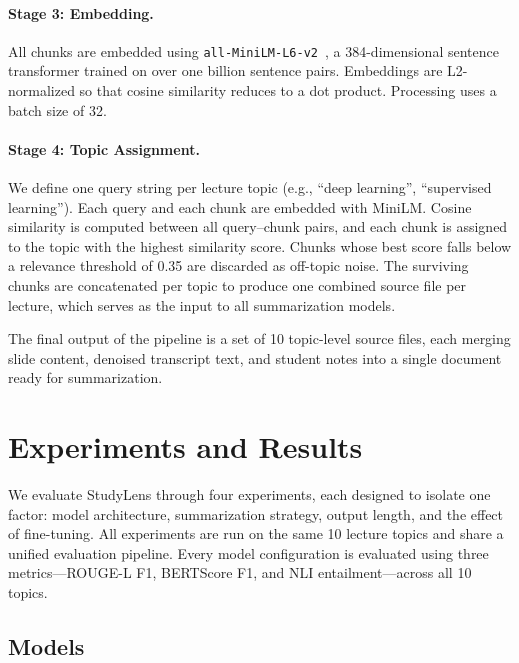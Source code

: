 \paragraph{Stage 3: Embedding.}
All chunks are embedded using \texttt{all-MiniLM-L6-v2}~\citep{reimers2019sentence}, a 384-dimensional sentence transformer trained on over one billion sentence pairs. Embeddings are L2-normalized so that cosine similarity reduces to a dot product. Processing uses a batch size of 32.

\paragraph{Stage 4: Topic Assignment.}
We define one query string per lecture topic (e.g., ``deep learning'', ``supervised learning''). Each query and each chunk are embedded with MiniLM. Cosine similarity is computed between all query--chunk pairs, and each chunk is assigned to the topic with the highest similarity score. Chunks whose best score falls below a relevance threshold of 0.35 are discarded as off-topic noise. The surviving chunks are concatenated per topic to produce one combined source file per lecture, which serves as the input to all summarization models.

The final output of the pipeline is a set of 10 topic-level source files, each merging slide content, denoised transcript text, and student notes into a single document ready for summarization.


\section{Experiments and Results}
\label{sec:results}

We evaluate StudyLens through four experiments, each designed to isolate one factor: model architecture, summarization strategy, output length, and the effect of fine-tuning. All experiments are run on the same 10 lecture topics and share a unified evaluation pipeline. Every model configuration is evaluated using three metrics---ROUGE-L F1, BERTScore F1, and NLI entailment---across all 10 topics.

\subsection{Models}
\label{sec:models}

